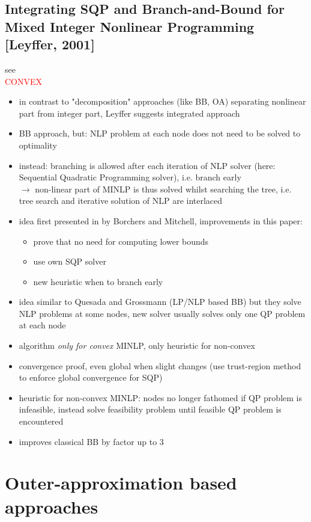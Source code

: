 \documentclass{article}
\begin{document}
\subsection{Integrating SQP and Branch-and-Bound for Mixed Integer Nonlinear Programming [Leyffer, 2001]}
see \cite{leyffer2001integrating}\\
\textcolor{red}{CONVEX}
\begin{itemize}
\item in contrast to "decomposition" approaches (like BB, OA) separating nonlinear part from integer part, Leyffer suggests integrated approach
\item BB approach, but: NLP problem at each node does not need to be solved to optimality
\item instead: branching is allowed after each iteration of NLP solver (here: Sequential Quadratic Programming solver), i.e. branch early\\
$\rightarrow$ non-linear part of MINLP is thus solved whilst searching the tree, i.e. tree search and iterative solution of NLP are interlaced
\item idea first presented in \cite{borchers1994improved} by Borchers and Mitchell, improvements in this paper:
	\begin{itemize}
	\item prove that no need for computing lower bounds
	\item use own SQP solver
	\item new heuristic when to branch early
	\end{itemize}
\item idea similar to Quesada and Grossmann \cite{quesada1992lp} (LP/NLP based BB) but they solve NLP problems at some nodes, new solver usually solves only one QP problem at each node
\item algorithm \emph{only for convex} MINLP, only heuristic for non-convex
\item convergence proof, even global when slight changes (use trust-region method to enforce global convergence for SQP)
\item heuristic for non-convex MINLP: nodes no longer fathomed if QP problem is infeasible, instead solve feasibility problem until feasible QP problem is encountered
\item improves classical BB by factor up to 3
\end{itemize}

\newpage
\section{Outer-approximation based approaches}
\end{document}
